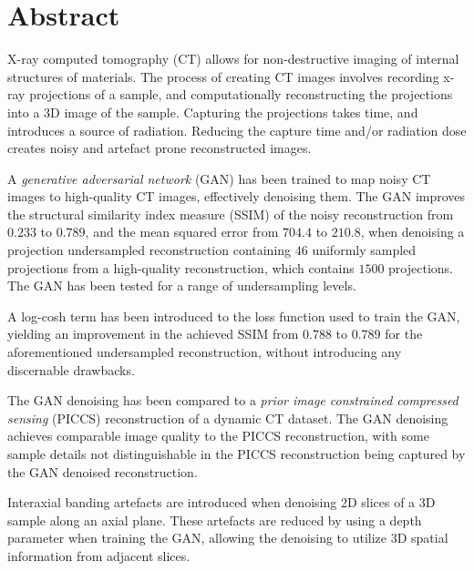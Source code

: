 \chapter*{Abstract}
X-ray computed tomography (CT) allows for non-destructive imaging of internal structures of materials. The process of creating CT images involves recording x-ray projections of a sample, and computationally reconstructing the projections into a 3D image of the sample. Capturing the projections takes time, and introduces a source of radiation. Reducing the capture time and/or radiation dose creates noisy and artefact prone reconstructed images. 

A \textit{generative adversarial network} (GAN) has been trained to map noisy CT images to high-quality CT images, effectively denoising them. The GAN improves the structural similarity index measure (SSIM) of the noisy reconstruction from $0.233$ to $0.789$, and the mean squared error from $704.4$ to $210.8$, when denoising a projection undersampled reconstruction containing $46$ uniformly sampled projections from a high-quality reconstruction, which contains $1500$ projections. The GAN has been tested for a range of undersampling levels. 

A log-cosh term has been introduced to the loss function used to train the GAN, yielding an improvement in the achieved SSIM from $0.788$ to $0.789$ for the aforementioned undersampled reconstruction, without introducing any discernable drawbacks. 

The GAN denoising has been compared to a \textit{prior image constrained compressed sensing} (PICCS) reconstruction of a dynamic CT dataset. The GAN denoising achieves comparable image quality to the PICCS reconstruction, with some sample details not distinguishable in the PICCS reconstruction being captured by the GAN denoised reconstruction. 

Interaxial banding artefacts are introduced when denoising 2D slices of a 3D sample along an axial plane. These artefacts are reduced by using a depth parameter when training the GAN, allowing the denoising to utilize 3D spatial information from adjacent slices. 